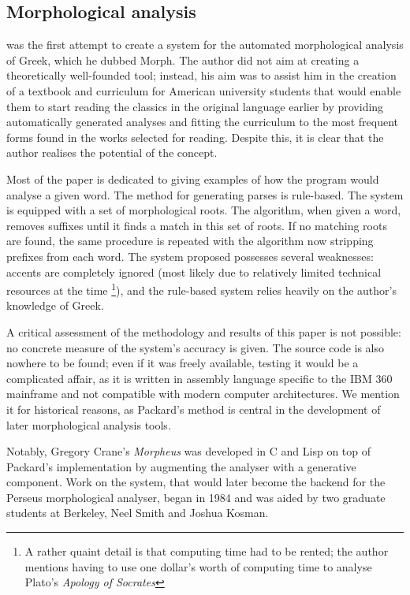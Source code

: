 \subsection{Morphological analysis}

\cite{packard1973computer} was the first attempt to create a system
for the automated morphological analysis of Greek, which he dubbed
Morph. The author did not aim at creating a theoretically well-founded
tool; instead, his aim was to assist him in the creation of a textbook
and curriculum for American university students that would enable them
to start reading the classics in the original language earlier by
providing automatically generated analyses and fitting the curriculum
to the most frequent forms found in the works selected for
reading. Despite this, it is clear that the author realises the
potential of the concept.

Most of the paper is dedicated to giving examples of how the program
would analyse a given word. The method for generating parses is
rule-based. The system is equipped with a set of morphological
roots. The algorithm, when given a word, removes suffixes until it
finds a match in this set of roots. If no matching roots are found,
the same procedure is repeated with the algorithm now stripping
prefixes from each word. The system proposed possesses several
weaknesses: accents are completely ignored (most likely due to
relatively limited technical resources at the time \footnote{A rather
quaint detail is that computing time had to be rented; the author
mentions having to use one dollar's worth of computing time to analyse
Plato's \textit{Apology of Socrates}}), and the rule-based system relies heavily on
the author's knowledge of Greek.

A critical assessment of the methodology and results of this paper is
not possible: no concrete measure of the system's accuracy is
given. The source code is also nowhere to be found; even if it was
freely available, testing it would be a complicated affair, as it is
written in assembly language specific to the IBM 360 mainframe and not
compatible with modern computer architectures. We mention it for
historical reasons, as Packard's method is central in the development
of later morphological analysis tools. 

Notably, Gregory Crane's \textit{Morpheus} was developed in C and Lisp
on top of Packard's implementation by augmenting the analyser with a
generative component. Work on the system, that would later become the
backend for the Perseus morphological analyser, began in 1984 and was
aided by two graduate students at Berkeley, Neel Smith and Joshua
Kosman.

